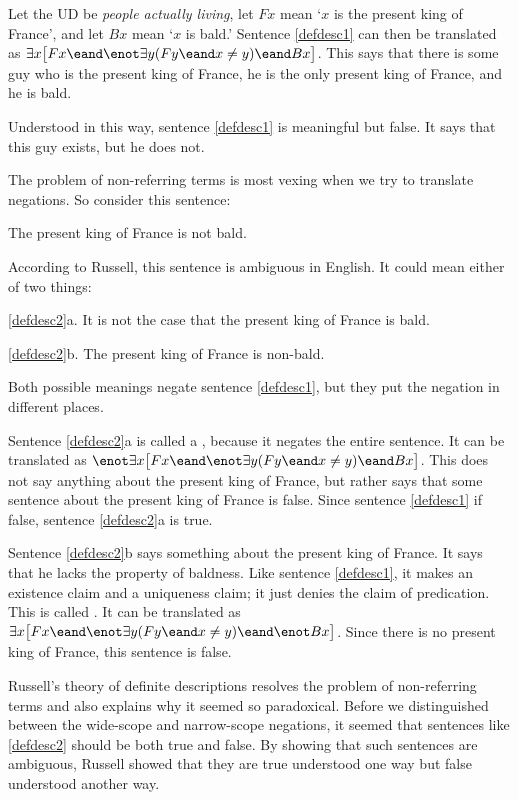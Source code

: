 Let the UD be \emph{people actually living}, let $Fx$ mean `$x$ is the present king of France', and let $Bx$ mean `$x$ is bald.' Sentence \ref{defdesc1} can then be translated as $\exists x\bigl[Fx \eand \enot\exists y(Fy \eand x\neq y) \eand Bx\bigr]$. This says that there is some guy who is the present king of France, he is the only present king of France, and he is bald.

Understood in this way, sentence \ref{defdesc1} is meaningful but false. It says that this guy exists, but he does not.

The problem of non-referring terms is most vexing when we try to translate negations. So consider this sentence:
\begin{earg}
\item[\ex{defdesc2}] The present king of France is not bald.
\end{earg}
According to Russell, this sentence is ambiguous in English. It could mean either of two things:
\begin{earg}
\item[\ref{defdesc2}a.] It is not the case that the present king of France is bald.
\item[\ref{defdesc2}b.] The present king of France is non-bald.
\end{earg}
Both possible meanings negate sentence \ref{defdesc1}, but they put the negation in different places.

Sentence \ref{defdesc2}a is called a , because it negates the entire sentence. It can be translated as $\enot\exists x\bigl[Fx \eand \enot\exists y(Fy \eand x\neq y) \eand Bx\bigr]$. This does not say anything about the present king of France, but rather says that some sentence about the present king of France is false. Since sentence \ref{defdesc1} if false, sentence \ref{defdesc2}a is true.

Sentence \ref{defdesc2}b says something about the present king of France. It says that he lacks the property of baldness. Like sentence \ref{defdesc1}, it makes an existence claim and a uniqueness claim; it just denies the claim of predication. This is called . It can be translated as $\exists x\bigl[Fx \eand \enot\exists y(Fy \eand x\neq y) \eand \enot Bx\bigr]$. Since there is no present king of France, this sentence is false.

Russell's theory of definite descriptions resolves the problem of non-referring terms and also explains why it seemed so paradoxical. Before we distinguished between the wide-scope and narrow-scope negations, it seemed that sentences like \ref{defdesc2} should be both true and false. By showing that such sentences are ambiguous, Russell showed that they are true understood one way but false understood another way.

